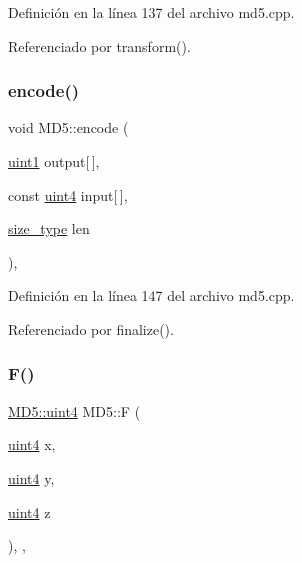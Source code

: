Definición en la línea 137 del archivo md5.\+cpp.



Referenciado por transform().

\hypertarget{classMD5_a52603a1b589b2863cad4caae7f259b7e}{}\label{classMD5_a52603a1b589b2863cad4caae7f259b7e} 
\subsubsection{\texorpdfstring{encode()}{encode()}}
{\footnotesize\ttfamily void M\+D5\+::encode (\begin{DoxyParamCaption}\item[{\hyperlink{classMD5_a3b1c4901139aef256ee49c4ab14d09f9}{uint1}}]{output\mbox{[}$\,$\mbox{]},  }\item[{const \hyperlink{classMD5_a2e5b84a3d7db292f49873061214a0444}{uint4}}]{input\mbox{[}$\,$\mbox{]},  }\item[{\hyperlink{classMD5_aa836972700679dbcff6ae8337f6db464}{size\+\_\+type}}]{len }\end{DoxyParamCaption})\hspace{0.3cm}{\ttfamily [static]}, {\ttfamily [private]}}



Definición en la línea 147 del archivo md5.\+cpp.



Referenciado por finalize().

\hypertarget{classMD5_a95b7adf4602b92e84ca5f34084859e79}{}\label{classMD5_a95b7adf4602b92e84ca5f34084859e79} 
\subsubsection{\texorpdfstring{F()}{F()}}
{\footnotesize\ttfamily \hyperlink{classMD5_a2e5b84a3d7db292f49873061214a0444}{M\+D5\+::uint4} M\+D5\+::F (\begin{DoxyParamCaption}\item[{\hyperlink{classMD5_a2e5b84a3d7db292f49873061214a0444}{uint4}}]{x,  }\item[{\hyperlink{classMD5_a2e5b84a3d7db292f49873061214a0444}{uint4}}]{y,  }\item[{\hyperlink{classMD5_a2e5b84a3d7db292f49873061214a0444}{uint4}}]{z }\end{DoxyParamCaption})\hspace{0.3cm}{\ttfamily [inline]}, {\ttfamily [static]}, {\ttfamily [private]}}



